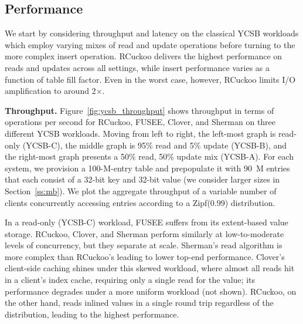 


\subsection{Performance}

We start by considering throughput and latency on the classical YCSB
workloads which employ varying mixes of read and update operations
before turning to the more complex insert operation.  RCuckoo delivers
the highest performance on reads and updates across all settings,
while insert performance varies as a function of table fill factor.
Even in the worst case, however, RCuckoo limits I/O amplification to
around 2$\times$.

\textbf{Throughput.} Figure~\ref{fig:ycsb_throughput} shows throughput
in terms of operations per second for RCuckoo, FUSEE, Clover, and
Sherman on three different YCSB workloads.  Moving from left to right,
the left-most graph is read-only (YCSB-C), the middle graph is 95\%
read and 5\% update (YCSB-B), and the right-most graph presents a 50\%
read, 50\% update mix (YCSB-A).  For each system, we provision a
100-M-entry table and prepopulate it with 90~M entries that each
consist of a 32-bit key and 32-bit value (we consider larger sizes in Section~\ref{ss:mb}).  We plot the aggregate throughput of a variable number of
clients concurrently accessing entries according to a Zipf(0.99)
distribution.

In a read-only (YCSB-C) workload, FUSEE suffers from its extent-based
value storage.  RCuckoo, Clover, and Sherman perform similarly at
low-to-moderate levels of concurrency, but they separate at scale.
Sherman's read algorithm is more complex than RCuckoo's leading to
lower top-end performance.  Clover's client-side caching shines under
this skewed workload, where almost all reads hit in a client's index
cache, requiring only a single read for the value; its performance
degrades under a more uniform workload (not shown).  RCuckoo, on the
other hand, reads inlined values in a single round trip
regardless of the distribution, leading to the highest performance.

